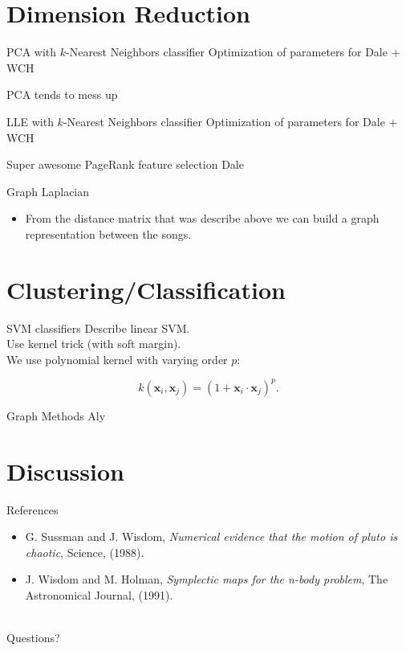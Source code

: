 \documentclass[xcolor=dvipsnames,t]{beamer} %
\begin{document}
\section{Dimension Reduction}
\begin{frame}{PCA with $k$-Nearest Neighbors classifier}
Optimization of parameters for Dale + WCH

PCA tends to mess up 
\end{frame}

\begin{frame}{LLE with $k$-Nearest Neighbors classifier}
Optimization of parameters for Dale + WCH
\end{frame}

\begin{frame}{Super awesome PageRank feature selection}
Dale
\end{frame}

\begin{frame}{Graph Laplacian}
\begin{itemize}
\item From the distance matrix that was describe above we can build a graph representation between the songs. 
\end{itemize}
\end{frame}



\section{Clustering/Classification}
\begin{frame}{SVM classifiers}
Describe linear SVM.\\
Use kernel trick (with soft margin).\\
We use polynomial kernel with varying order $p$:

\[ k(\mathbf{x}_i,\mathbf{x}_j) = \left(1 + \mathbf{x}_i\cdot\mathbf{x}_j\right)^p. \] 

\end{frame}

\begin{frame}{Graph Methods}
Aly
\end{frame}


\section{Discussion}

\begin{frame}{References}
   \begin{itemize}
      \item G. Sussman and J. Wisdom, \emph{Numerical evidence that the motion of pluto is chaotic}, Science, (1988).\\
      \item J. Wisdom and M. Holman, \emph{Symplectic maps for the n-body problem}, The Astronomical Journal, (1991).\\
   \end{itemize}
   ~\\
   Questions?

\end{frame}
\end{document}
